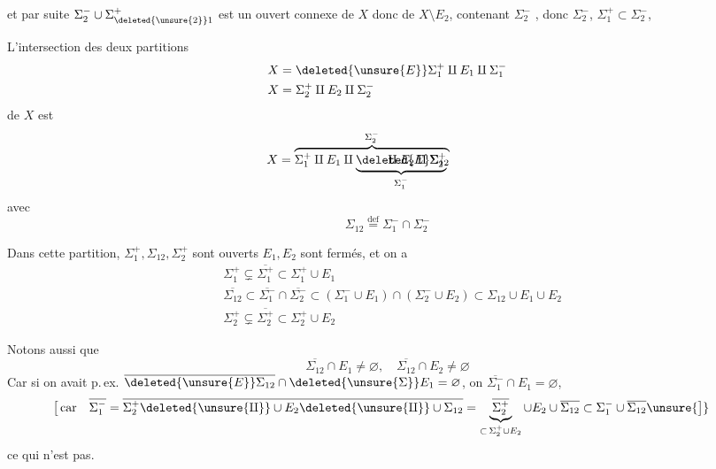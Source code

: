 et par suite $\Sigma_2^-\cup\Sigma_{\deleted{\unsure{2}}1}^+$  est un ouvert connexe de $X$ donc de $X\setminus E_2$, contenant  $\Sigma_2^-$ , donc    $\Sigma_2^-$,  $\Sigma_1^+\subset\Sigma_2^-$, 

L'intersection des deux partitions
\[
 \begin{aligned}
 X&=\deleted{\unsure{E}}\Sigma_1^+\amalg E_1\amalg\Sigma_1^-\\
 X&=\Sigma_2^+\amalg E_2\amalg\Sigma_2^-
 \end{aligned}
\]
de $X$ est
\[
 X=\overbrace{\Sigma_1^+\amalg E_1\amalg
 \rlap{$\displaystyle\underbrace{\phantom{E\Sigma_{12}}\amalg
 E_2\amalg\Sigma_2^+}_{\Sigma_1^-}$}\deleted{E}\Sigma_{12}}^{\Sigma_2^-}
 \phantom{\amalg E_2\amalg\Sigma_2^+}
\]
avec
\[
 \Sigma_{12}\overset{\text{def}}{=}\Sigma_1^-\cap\Sigma_2^-
\]

Dans cette partition, $\Sigma_1^+,\Sigma_{12},\Sigma_2^+$ sont ouverts $E_1,E_2$ sont fermés, et on a
\[
 \begin{aligned}
 &\Sigma_1^+\subsetneq\overline{\Sigma_1^+}\subset\Sigma_1^+\cup E_1\\
 &\overline{\Sigma_{12}}\subset\overline{\Sigma_1^-}\cap\overline{\Sigma_2^-}\subset
 (\Sigma_1^-\cup E_1)\cap(\Sigma_2^-\cup E_2)\subset\Sigma_{12}\cup E_1\cup E_2\\
 &\Sigma_2^+\subsetneq\overline{\Sigma_2^+}\subset\Sigma_2^+\cup E_2
 \end{aligned}
\]

Notons aussi que
\[
 \overline{\Sigma_{12}}\cap E_1\ne\varnothing,\quad
 \overline{\Sigma_{12}}\cap E_2\ne\varnothing
\]
Car si on avait p.\,ex. $\overline{\deleted{\unsure{E}}\Sigma_{12}}\cap
\deleted{\unsure{\Sigma}}E_1=\varnothing$, on 
 $\overline{\Sigma_1^-}\cap E_1=\varnothing$,
\[
 \begin{aligned}
 \big[\,\text{car}\quad\overline{\Sigma_1^-}&=
 \overline{\Sigma_2^+\deleted{\unsure{\amalg}}\cup E_2
 \deleted{\unsure{\amalg}}\cup\Sigma_{12}}=
 \underbrace{\overline{\Sigma_2^+}}_{\subset\,\Sigma_2^+\cup E_2}\cup E_2
 \cup\overline{\Sigma_{12}}\subset\Sigma_1^-\cup\overline{\Sigma_{12}}\unsure{\big]}
 \end{aligned}
\]
ce qui n'est pas.

